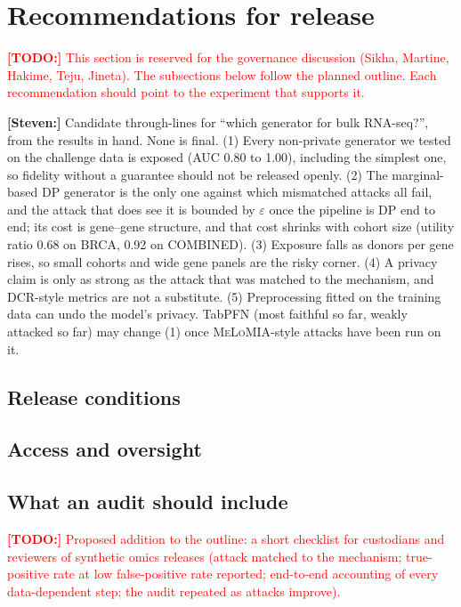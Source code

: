 \documentclass[webpdf,contemporary,large]{oup-authoring-template}
\newif\ifdraft \drafttrue
\newcommand{\annot}[3]{\ifdraft\textcolor{#1}{\textbf{[#2:]} #3}\fi}
\newcommand{\steven}[1]{\annot{Periwinkle}{Steven}{#1}}
\newcommand{\todo}[1]{\annot{red}{TODO}{#1}}
\newcommand{\melo}{\textsc{MeLoMIA}}
\begin{document}
\section{Recommendations for release}
\label{sec:governance}

\todo{This section is reserved for the governance discussion (Sikha, Martine, Hakime, Teju, Jineta). The subsections below follow the planned outline. Each recommendation should point to the experiment that supports it.}

\steven{Candidate through-lines for ``which generator for bulk RNA-seq?'', from the results in hand. None is final. (1) Every non-private generator we tested on the challenge data is exposed (AUC 0.80 to 1.00), including the simplest one, so fidelity without a guarantee should not be released openly. (2) The marginal-based DP generator is the only one against which mismatched attacks all fail, and the attack that does see it is bounded by $\varepsilon$ once the pipeline is DP end to end; its cost is gene--gene structure, and that cost shrinks with cohort size (utility ratio 0.68 on BRCA, 0.92 on COMBINED). (3) Exposure falls as donors per gene rises, so small cohorts and wide gene panels are the risky corner. (4) A privacy claim is only as strong as the attack that was matched to the mechanism, and DCR-style metrics are not a substitute. (5) Preprocessing fitted on the training data can undo the model's privacy. TabPFN (most faithful so far, weakly attacked so far) may change (1) once \melo{}-style attacks have been run on it.}

\subsection{Release conditions}
\label{sec:gov-release}

\subsection{Access and oversight}
\label{sec:gov-access}

\subsection{What an audit should include}
\label{sec:gov-audit}

\todo{Proposed addition to the outline: a short checklist for custodians and reviewers of synthetic omics releases (attack matched to the mechanism; true-positive rate at low false-positive rate reported; end-to-end accounting of every data-dependent step; the audit repeated as attacks improve).}
\end{document}
